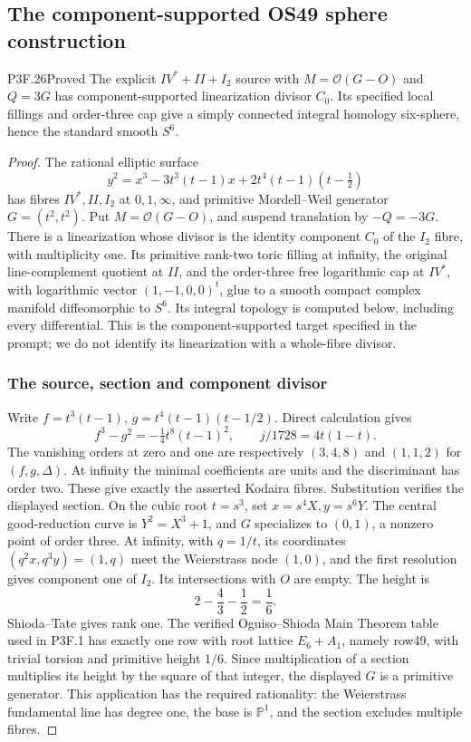 \subsection{The component-supported OS49 sphere construction}
\begin{statement}{P3F.26}{Proved}
The explicit $IV^*+II+I_2$ source with $M=\mathcal O(G-O)$ and $Q=3G$ has component-supported linearization divisor $C_0$. Its specified local fillings and order-three cap give a simply connected integral homology six-sphere, hence the standard smooth $S^6$.
\end{statement}
\begin{proof}
The rational elliptic surface \[
 y^2=x^3-3t^3(t-1)x+2t^4(t-1)(t-\tfrac12)
                                                        \tag{P3F.26.1}
\] has fibres \(IV^*,II,I_2\) at \(0,1,\infty\), and primitive Mordell--Weil generator \(G=(t^2,t^2)\). Put \(M=\mathcal O(G-O)\), and suspend translation by \(-Q=-3G\). There is a linearization whose divisor is the identity component \(C_0\) of the \(I_2\) fibre, with multiplicity one. Its primitive rank-two toric filling at infinity, the original line-complement quotient at \(II\), and the order-three free logarithmic cap at \(IV^*\), with logarithmic vector \((1,-1,0,0)^t\), glue to a smooth compact complex manifold diffeomorphic to \(S^6\). Its integral topology is computed below, including every differential. This is the component-supported target specified in the prompt; we do not identify its linearization with a whole-fibre divisor.

\subsubsection{The source, section and component divisor}\label{the-source-section-and-component-divisor}

Write \(f=t^3(t-1)\), \(g=t^4(t-1)(t-1/2)\). Direct calculation gives \[
 f^3-g^2=-\tfrac14t^8(t-1)^2,
 \qquad j/1728=4t(1-t).
\] The vanishing orders at zero and one are respectively \((3,4,8)\) and \((1,1,2)\) for \((f,g,\Delta)\). At infinity the minimal coefficients are units and the discriminant has order two. These give exactly the asserted Kodaira fibres. Substitution verifies the displayed section. On the cubic root \(t=s^3\), set \(x=s^4X,y=s^6Y\). The central good-reduction curve is \(Y^2=X^3+1\), and \(G\) specializes to \((0,1)\), a nonzero point of order three. At infinity, with \(q=1/t\), its coordinates \((q^2x,q^3y)=(1,q)\) meet the Weierstrass node \((1,0)\), and the first resolution gives component one of \(I_2\). Its intersections with \(O\) are empty. The height is \[
 2-\frac43-\frac12=\frac16.
\] Shioda--Tate gives rank one. The verified Oguiso--Shioda Main Theorem table used in P3F.1 has exactly one row with root lattice \(E_6+A_1\), namely row49, with trivial torsion and primitive height \(1/6\). Since multiplication of a section multiplies its height by the square of that integer, the displayed \(G\) is a primitive generator. This application has the required rationality: the Weierstrass fundamental line has degree one, the base is \(\mathbb P^1\), and the section excludes multiple fibres.


\end{proof}
